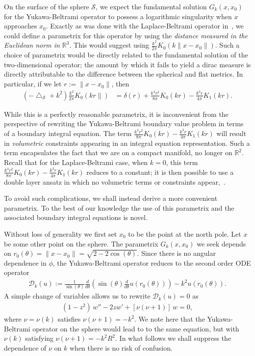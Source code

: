 \documentclass[final]{siamltex}
\newcommand{\lap}{\bigtriangleup}
\renewcommand{\S} {\mathcal{S}}
\begin{document}
On the surface of the sphere $\S$, we expect the fundamental solution
$G_k(x,x_{0})$ for the Yukawa-Beltrami operator to possess a
logarithmic singularity when $x$ approaches $x_{0}$. Exactly as was
done  with the Laplace-Beltrami operator in~\cite{gemmrich}, we could
define a parametrix for this operator by using the {\it distance measured in the Euclidean norm in $\mathbb{R}^3$}. This would suggest using $
\frac{k^2}{2\pi}K_0(k\|x-x_{0}\|)$.  Such a choice of parametrix would be
directly related to the fundamental solution of the two-dimensional
operator; the amount by which it fails
to yield a dirac measure is directly attributable to the difference
between the spherical and flat metrics.  In particular, if we let
$r:=\|x-x_{0}\|$, then
\begin{align*}
  (-\lap_{\S} + k^{2})\frac{k^2}{2\pi}K_0(kr\|)&=
    \delta(r) 
    +\frac{k^{4}r^{2}}{8\pi}K_{0}(kr) - \frac{k^{3}r}{4\pi}K_{1}(kr).
\end{align*}

While this is a perfectly reasonable parametrix, it is inconvenient from
the perspective of rewriting the Yukawa-Beltrami boundary value problem
in terms of a boundary integral equation. The term $\frac{k^{4}r^{2}}{8\pi}K_{0}(kr) - \frac{k^{3}r}{4\pi}K_{1}(kr)$ will result
in {\it volumetric} constraints  appearing in an integral equation
representation. Such a term encapsulates the fact that we are on a
compact manifold, no longer on $\mathbb{R}^2$. Recall that for the
Laplace-Beltrami case, when $k=0$, this term $\frac{k^{4}r^{2}}{8\pi}K_{0}(kr) - \frac{k^{3}r}{4\pi}K_{1}(kr)$ reduces to a
constant; it is then possible to use a double layer ansatz in which no
volumetric terms or constraints appear,~\cite{kro:nig2013}.  

To avoid
such complications, we shall instead derive a more convenient
parametrix. To the best of our knowledge the use of this parametrix and
the associated boundary integral equations is novel. 

Without loss of generality we first set $x_{0}$ to be the point at
the north pole.  Let $x$ be some other point on the sphere. The parametrix $G_k(x,x_0)$ we seek depends on
$r_0(\theta)=\|x-x_0\|=\sqrt{2-2\cos(\theta)} $. Since there is no
angular dependence in $\phi$, the Yukawa-Beltrami operator reduces to
the second order ODE operator
\begin{align*}
\mathcal{D}_k(u):=\frac{1}{\sin(\theta)}\frac{d}{d\theta}\left(\sin(\theta)
\frac{d}{d\theta}u(r_0(\theta))\right)-k^2 u(r_{0}(\theta)).
\end{align*}
A simple change of variables allows us to rewrite $\mathcal{D}_k (u)=0$
as 
\begin{align}
  \label{LegendrePequation}
  (1-z^2)\,w'' -2zw' + \left[\nu(\nu+1)\right]\,w = 0,
\end{align}
where $\nu = \nu(k)$ satisfies $\nu(\nu + 1) = -k^2$. We note here that the Yukawa-Beltrami operator on the sphere would lead to 
to the same equation, but with $\nu(k)$ satisfying $\nu(\nu+1)=-k^2R^2$. In
what follows we shall suppress the
dependence of $\nu$ on $k$ when there is no risk of confusion.
\end{document}
